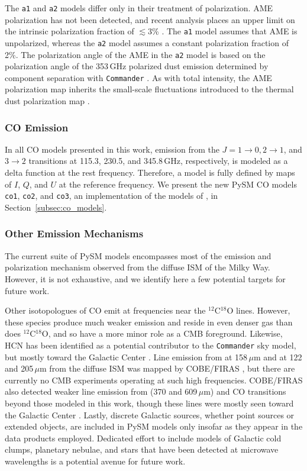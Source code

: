 \documentclass[twocolumn]{aastex631}
\begin{document}
The \texttt{a1} and \texttt{a2} models differ only in their treatment of polarization. AME polarization has not been detected, and recent analysis places an upper limit on the intrinsic polarization fraction of $\lesssim3$\% \citep{Herman:2023}. The \texttt{a1} model assumes that AME is unpolarized, whereas the \texttt{a2} model assumes a constant polarization fraction of 2\%. The polarization angle of the AME in the \texttt{a2} model is based on the polarization angle of the 353\,GHz polarized dust emission determined by component separation with \texttt{Commander} \citep{planck2014-a12}. As with total intensity, the AME polarization map inherits the small-scale fluctuations introduced to the thermal dust polarization map \citep[see][for details]{Thorne:2017}.

\subsubsection{CO Emission}
In all CO models presented in this work, emission from the $J = 1\rightarrow0, 2\rightarrow1$, and $3\rightarrow2$ transitions at 115.3, 230.5, and 345.8\,GHz, respectively, is modeled as a delta function at the rest frequency. Therefore, a model is fully defined by maps of $I$, $Q$, and $U$ at the reference frequency. We present the new PySM CO models \texttt{co1}, \texttt{co2}, and \texttt{co3}, an implementation of the models of \citet{Puglisi:2017}, in Section~\ref{subsec:co_models}.

\subsubsection{Other Emission Mechanisms} %
The current suite of PySM models encompasses most of the emission and polarization mechanism observed from the diffuse ISM of the Milky Way. However, it is not exhaustive, and we identify here a few potential targets for future work.

Other isotopologues of CO emit at frequencies near the $^{12}$C$^{18}$O lines. However, these species produce much weaker emission and reside in even denser gas than does $^{12}$C$^{18}$O, and so have a more minor role as a CMB foreground. Likewise, HCN has been identified as a potential contributor to the \texttt{Commander} sky model, but mostly toward the Galactic Center \citep{planck2014-a12}. Line emission from  at 158\,$\mu$m and  at 122 and 205\,$\mu$m from the diffuse ISM was mapped by COBE/FIRAS \citep{Bennett:1994}, but there are currently no CMB experiments operating at such high frequencies. COBE/FIRAS also detected weaker line emission from  (370 and 609\,$\mu$m) and CO transitions beyond those modeled in this work, though these lines were mostly seen toward the Galactic Center \citep{Bennett:1994}. Lastly, discrete Galactic sources, whether point sources or extended objects, are included in PySM models only insofar as they appear in the data products employed. Dedicated effort to include models of Galactic cold clumps, planetary nebulae, and stars that have been detected at microwave wavelengths is a potential avenue for future work. 
\end{document}
